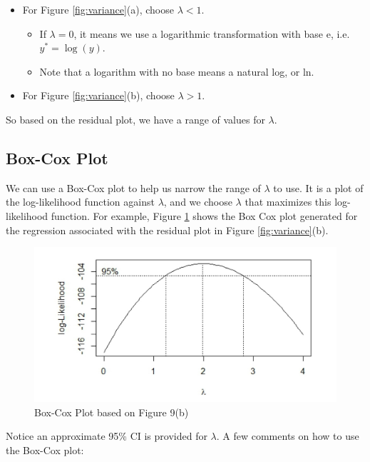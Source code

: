 \documentclass[
]{book}
\providecommand{\tightlist}{%
  \setlength{\itemsep}{0pt}\setlength{\parskip}{0pt}}
\begin{document}
\begin{itemize}
\tightlist
\item
  For Figure \ref{fig:variance}(a), choose \(\lambda < 1\).

  \begin{itemize}
  \tightlist
  \item
    If \(\lambda = 0\), it means we use a logarithmic transformation with base e, i.e.~\(y^* = \log(y)\).
  \item
    Note that a logarithm with no base means a natural log, or ln.
  \end{itemize}
\item
  For Figure \ref{fig:variance}(b), choose \(\lambda > 1\).
\end{itemize}

So based on the residual plot, we have a range of values for \(\lambda\).

\hypertarget{box-cox-plot}{%
\subsection{Box-Cox Plot}\label{box-cox-plot}}

We can use a Box-Cox plot to help us narrow the range of \(\lambda\) to use. It is a plot of the log-likelihood function against \(\lambda\), and we choose \(\lambda\) that maximizes this log-likelihood function. For example, Figure \ref{fig:bcplot} shows the Box Cox plot generated for the regression associated with the residual plot in Figure \ref{fig:variance}(b).

\begin{figure}
\centering
\includegraphics{images/bcplot.jpg}
\caption{\label{fig:bcplot}Box-Cox Plot based on Figure 9(b)}
\end{figure}

Notice an approximate 95\% CI is provided for \(\lambda\). A few comments on how to use the Box-Cox plot:
\end{document}
